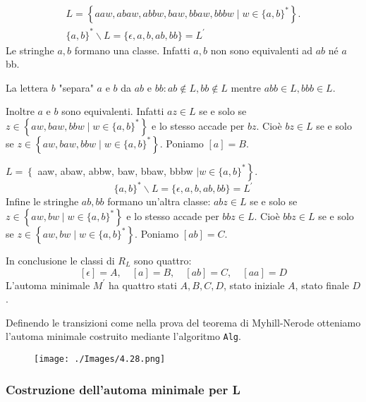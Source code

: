 \vspace{5mm}

$$
\begin{gathered}
L=\left\{a a w, a b a w, a b b w, b a w, b b a w, b b b w \mid w \in\{a, b\}^{*}\right\} . \\
\{a, b\}^{*} \backslash L=\{\epsilon, a, b, a b, b b\}=L^{\prime}
\end{gathered}
$$
Le stringhe $a, b$ formano una classe. Infatti $a, b$ non sono equivalenti ad $a b$ né $a$ bb.

La lettera $b$ "separa" $a$ e $b$ da $a b$ e $b b: a b \notin L, b b \notin L$ mentre $a b b \in L, b b b \in L$.

Inoltre $a$ e $b$ sono equivalenti. Infatti $a z \in L$ se e solo se $z \in\left\{a w, b a w, b b w \mid w \in\{a, b\}^{*}\right\}$ e lo stesso accade per $b z .$ Cioè $b z \in L$ se e solo se $z \in\left\{a w, b a w, b b w \mid w \in\{a, b\}^{*}\right\}$.
Poniamo $[a]=B$.

\vspace{5mm}

$L=\left\{\right.$ aaw, abaw, abbw, baw, bbaw, bbbw $\left.\mid w \in\{a, b\}^{*}\right\} .$
$$
\{a, b\}^{*} \backslash L=\{\epsilon, a, b, a b, b b\}=L^{\prime}
$$
Infine le stringhe $a b, b b$ formano un'altra classe: $a b z \in L$ se e solo se $z \in\left\{a w, b w \mid w \in\{a, b\}^{*}\right\}$ e lo stesso accade per $b b z \in L$. Cioè $b b z \in L$ se e solo se $z \in\left\{a w, b w \mid w \in\{a, b\}^{*}\right\}$. Poniamo $[a b]=C$.

\vspace{5mm}

In conclusione le classi di $R_{L}$ sono quattro:
$$
[\epsilon]=A, \quad[a]=B, \quad[a b]=C, \quad[a a]=D
$$
L'automa minimale $M^{\prime}$ ha quattro stati $A, B, C, D$, stato iniziale $A$, stato finale $D$.

Definendo le transizioni come nella prova del teorema di Myhill-Nerode otteniamo l'automa minimale costruito mediante l'algoritmo \texttt{Alg}.

\begin{figure}[hbpt!]
    \centering
    \texttt{[image: ./Images/4.28.png]}
\end{figure}
\FloatBarrier

\subsubsection{Costruzione dell'automa minimale per L}

